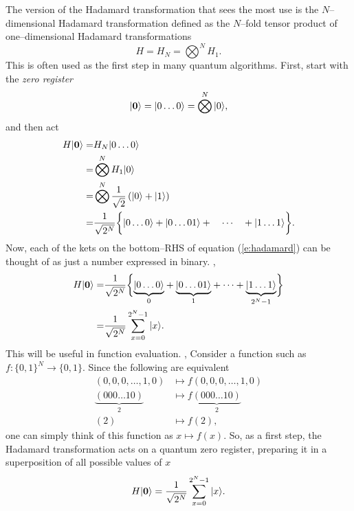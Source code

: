 The version of the Hadamard transformation that sees the most use is
the $N$--dimensional Hadamard transformation defined as the $N$--fold
tensor product of one--dimensional Hadamard transformations
\begin{equation}
H= H_N= \bigotimes^N H_1.
\end{equation}
This is often used as the first step in many quantum algorithms.
First, start with the \emph{zero register} 
\begin{equation}
{|{\bf 0}\rangle}={|{0\ldots 0}\rangle} = \bigotimes^N{|{0}\rangle},
\end{equation} and then act
\begin{equation}
\begin{split}
H{|{\bf 0}\rangle} =& H_N{|{0\ldots 0}\rangle}\\
=& \bigotimes^N H_1{|{0}\rangle}\\
=& \bigotimes^N \frac{1}{\sqrt{2}}\left({|{0}\rangle} +{|{1}\rangle}\right)\\
=& \frac{1}{\sqrt{2^N}}\biggl\lbrace {|{0\ldots 0}\rangle} + {|{0\ldots 01}\rangle} +
\quad\cdots\quad + {|{1\ldots 1}\rangle}\biggr\rbrace.
\end{split}
\label{e:hadamard}
\end{equation}
Now, each of the kets on the bottom--RHS of equation (\ref{e:hadamard})
can be thought of as just a number expressed in binary. \ie,
\begin{equation}
\begin{split}
H{|{\bf 0}\rangle} =& \frac{1}{\sqrt{2^N}}\biggl\lbrace 
\underset{0}{\underbrace{{|{0\ldots 0}\rangle}}}
+ \underset{1}{\underbrace{{|{0\ldots 01}\rangle}}} + \cdots 
+ \underset{2^N-1}{\underbrace{{|{1\ldots 1}\rangle}}}\biggr\rbrace \\
=& \frac{1}{\sqrt{2^N}}\sum_{x=0}^{2^N-1} {|{x}\rangle}.
\end{split}
\end{equation}
This will be useful in function evaluation. 
\ie, Consider a function such as $f\colon\lbrace 0,1\rbrace^N\to\lbrace 
0,1\rbrace$.
Since the following are equivalent
\begin{equation}
\begin{split}
(0,0,0,\ldots,1,0)&\mapsto f(0,0,0,\ldots,1,0)\\
\underset{2}{\underbrace{(000\ldots 10)}}&
\mapsto f\underset{2}{\underbrace{(000\ldots 10)}}\\
(2)&\mapsto f(2),
\end{split}
\end{equation}
one can simply think of this function as $x\mapsto f(x)$.
So, as a first step, the Hadamard transformation acts on a quantum 
zero register, preparing it in a superposition of all possible values 
of $x$
\begin{equation}
H{|{\bf 0}\rangle} = \frac{1}{\sqrt{2^N}}\sum_{x=0}^{2^N-1} {|{x}\rangle}.
\end{equation}

